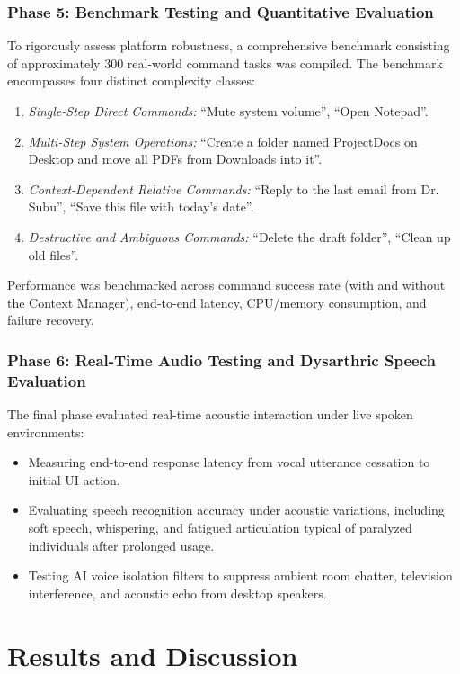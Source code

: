 \documentclass[12pt,a4paper]{report}
\begin{document}
\subsection{Phase 5: Benchmark Testing and Quantitative Evaluation}
To rigorously assess platform robustness, a comprehensive benchmark consisting of approximately 300 real-world command tasks was compiled. The benchmark encompasses four distinct complexity classes:
\begin{enumerate}
    \item \textit{Single-Step Direct Commands:} ``Mute system volume'', ``Open Notepad''.
    \item \textit{Multi-Step System Operations:} ``Create a folder named ProjectDocs on Desktop and move all PDFs from Downloads into it''.
    \item \textit{Context-Dependent Relative Commands:} ``Reply to the last email from Dr. Subu'', ``Save this file with today's date''.
    \item \textit{Destructive and Ambiguous Commands:} ``Delete the draft folder'', ``Clean up old files''.
\end{enumerate}
Performance was benchmarked across command success rate (with and without the Context Manager), end-to-end latency, CPU/memory consumption, and failure recovery.

\subsection{Phase 6: Real-Time Audio Testing and Dysarthric Speech Evaluation}
The final phase evaluated real-time acoustic interaction under live spoken environments:
\begin{itemize}
    \item Measuring end-to-end response latency from vocal utterance cessation to initial UI action.
    \item Evaluating speech recognition accuracy under acoustic variations, including soft speech, whispering, and fatigued articulation typical of paralyzed individuals after prolonged usage.
    \item Testing AI voice isolation filters to suppress ambient room chatter, television interference, and acoustic echo from desktop speakers.
\end{itemize}


\chapter{Results and Discussion}
\label{chap:results}
\end{document}
